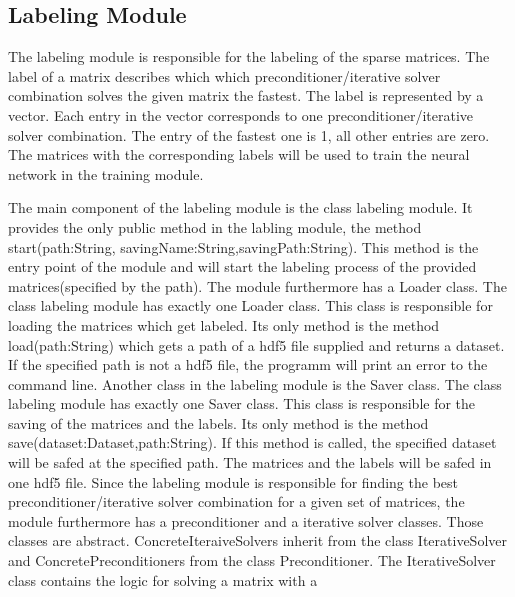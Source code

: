 \documentclass[parskip=full]{scrartcl}
\begin{document}
\subsection{Labeling Module}
The labeling module is responsible for the labeling of the sparse matrices. The label of a matrix describes which which preconditioner/iterative solver combination solves the given matrix the fastest. The label is represented by a vector. Each entry in the vector corresponds to one preconditioner/iterative solver combination. The entry of the fastest one is 1, all other entries are zero. The matrices with the corresponding labels will be used to train the neural network in the training module. 

The main component of the labeling module is the class labeling module. It provides the only public method in the labling module, the method start(path:String, savingName:String,savingPath:String). This method is the entry point of the module and will start the labeling process of the provided matrices(specified by the path). \newline\newline
The module furthermore has a Loader class. The class labeling module has exactly one Loader class. This class is responsible for loading the matrices which get labeled. Its only method is the method load(path:String) which gets a path of a hdf5 file supplied and returns a dataset. If the specified path is not a hdf5 file, the programm will print an error to the command line. \newline\newline
Another class in the labeling module is the Saver class. The class labeling module has exactly one Saver class. This class is responsible for the saving of the matrices and the labels. Its only method is the method save(dataset:Dataset,path:String). If this method is called, the specified dataset will be safed at the specified path. The matrices and the labels will be safed in one hdf5 file.\newline
\newline
Since the labeling module is responsible for finding the best preconditioner/iterative solver combination for a given set of matrices, the module furthermore has a preconditioner and a iterative solver classes. Those classes are abstract. ConcreteIteraiveSolvers inherit from the class IterativeSolver and ConcretePreconditioners from the class Preconditioner.\newline
The IterativeSolver class contains the logic for solving a matrix with a 
\end{document}
